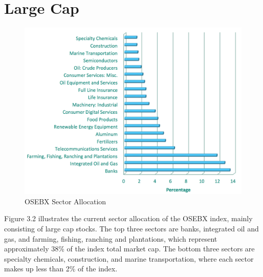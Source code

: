 \indent\newline 
\begin{table}[ht]
\centering
{}
\caption{Small cap summary statistics}
\end{table}

\section{Large Cap}
\begin{figure}[H]
\centering
\includegraphics [scale=0.44,angle=360]{figures/largesector.png}
\caption{OSEBX Sector Allocation \cite{bors}}
\label{fig:largesector}
\end{figure}
\indent\newline 
Figure 3.2 illustrates the current sector allocation of the OSEBX index, mainly consisting of large cap stocks. The top three sectors are banks, integrated oil and gas, and farming, fishing, ranching and plantations, which represent approximately 38\% of the index total market cap. The bottom three sectors are specialty chemicals, construction, and marine transportation, where each sector makes up less than 2\% of the index. 

